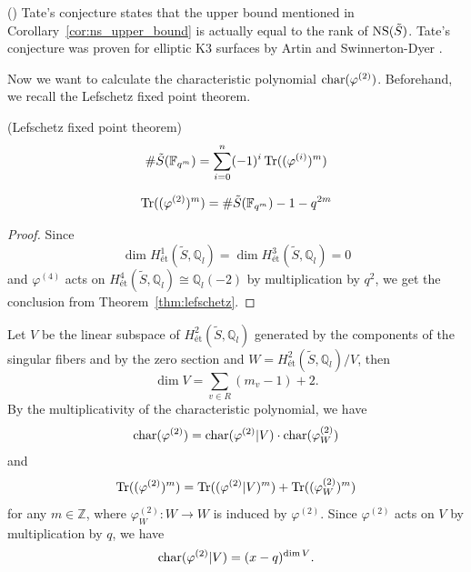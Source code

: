 \documentclass[main]{subfiles}
\begin{document}
\begin{rem}{(\cite[Remark 6.5.]{ref:vanluijk2007})}
    Tate's conjecture states that the upper bound mentioned in Corollary~\ref{cor:ns_upper_bound} is actually equal to the rank of $\operatorname{NS} (\tilde{S})$.
    Tate's conjecture was proven for elliptic K3 surfaces by Artin and Swinnerton-Dyer \cite{ref:Artin1973}.
\end{rem}

Now we want to calculate the characteristic polynomial $\operatorname{char} (\varphi^{(2)})$.
Beforehand, we recall the Lefschetz fixed point theorem.

\begin{thm}{(Lefschetz fixed point theorem)}
    \label{thm:lefschetz}
    \begin{equation*}
        \# \tilde{S}(\mathbb{F}_{q^{m}}) = \sum_{i = 0}^{n} ( - 1)^{i} \operatorname{Tr}((\varphi^{(i)})^{m})
    \end{equation*}
\end{thm}

\begin{cor}
    \label{cor:lefschetz}
    \begin{equation*}
        \operatorname{Tr} ((\varphi^{(2)})^{m}) = \# \tilde{S}(\mathbb{F}_{q^{m}}) - 1 - q^{2m}
    \end{equation*}
\end{cor}
\begin{proof}
    Since
    \begin{equation*}
        \dim H_{\text{\'et}}^{1}(\tilde{S}, \mathbb{Q}_{l}) = \dim H_{\text{\'et}}^{3}(\tilde{S}, \mathbb{Q}_{l}) = 0
    \end{equation*}
    and $\varphi^{(4)}$ acts on $H_{\text{\'et}}^{4}(\tilde{S}, \mathbb{Q}_l) \cong \mathbb{Q}_l(-2)$ by multiplication by $q^{2}$,
    we get the conclusion from Theorem~\ref{thm:lefschetz}.
\end{proof}

Let $V$ be the linear subspace of $H_{\text{\'et}}^{2}(\tilde{S}, \mathbb{Q}_{l})$ generated by the components of the singular fibers and by the zero section and $W = H_{\text{\'et}}^{2}(\tilde{S}, \mathbb{Q}_l) / V$, then
\begin{equation}
    \label{eq:dimV}
    \dim V = \sum_{v \in R} (m_{v} - 1) + 2.
\end{equation}
By the multiplicativity of the characteristic polynomial, we have
\begin{equation*}
    \operatorname{char} (\varphi^{(2)}) = \operatorname{char} (\varphi^{(2)} | V) \cdot \operatorname{char} (\varphi^{(2)}_{W})
\end{equation*}
and
\begin{equation}
    \operatorname{Tr} ((\varphi^{(2)})^{m}) = \operatorname{Tr} ((\varphi^{(2)} | V)^{m}) + \operatorname{Tr} ((\varphi^{(2)}_{W})^{m}) \label{eq:trcomposition}
\end{equation}
for any $m \in \mathbb{Z}$, where $\varphi^{(2)}_W: W \to W$ is induced by $\varphi^{(2)}$.
Since $\varphi^{(2)}$ acts on $V$ by multiplication by $q$, we have
\begin{equation*}
    \operatorname{char} (\varphi^{(2)} | V) = (x - q)^{\dim V}.
\end{equation*}
\end{document}
